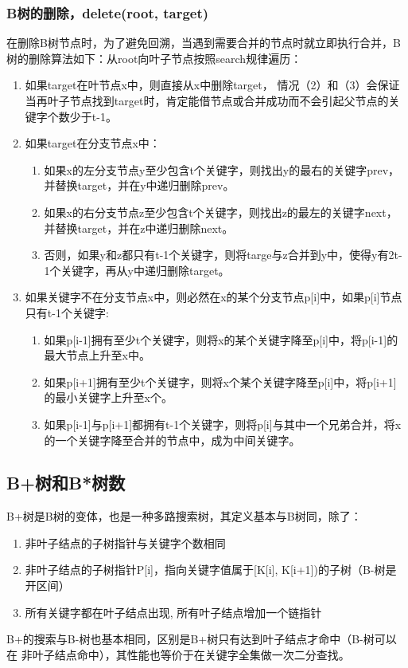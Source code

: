 \subsubsection{B树的删除，delete(root, target)}
在删除B树节点时，为了避免回溯，当遇到需要合并的节点时就立即执行合并，B树的删除算法如下：从root向叶子节点按照search规律遍历：
\begin{enumerate}
\item 如果target在叶节点x中，则直接从x中删除target，
情况（2）和（3）会保证当再叶子节点找到target时，肯定能借节点或合并成功而不会引起父节点的关键字个数少于t-1。
\item  如果target在分支节点x中：
	\begin{enumerate}
		\item 如果x的左分支节点y至少包含t个关键字，则找出y的最右的关键字prev，并替换target，并在y中递归删除prev。
		\item 如果x的右分支节点z至少包含t个关键字，则找出z的最左的关键字next，并替换target，并在z中递归删除next。
		\item 否则，如果y和z都只有t-1个关键字，则将targe与z合并到y中，使得y有2t-1个关键字，再从y中递归删除target。
	\end{enumerate}
\item 如果关键字不在分支节点x中，则必然在x的某个分支节点p[i]中，如果p[i]节点只有t-1个关键字:
	\begin{enumerate}
		\item 如果p[i-1]拥有至少t个关键字，则将x的某个关键字降至p[i]中，将p[i-1]的最大节点上升至x中。
		\item 如果p[i+1]拥有至少t个关键字，则将x个某个关键字降至p[i]中，将p[i+1]的最小关键字上升至x个。
		\item 如果p[i-1]与p[i+1]都拥有t-1个关键字，则将p[i]与其中一个兄弟合并，将x的一个关键字降至合并的节点中，成为中间关键字。
	\end{enumerate}
\end{enumerate}

\subsection{B+树和B*树数}
B+树是B树的变体，也是一种多路搜索树，其定义基本与B树同，除了：
\begin{enumerate}
  \item 非叶子结点的子树指针与关键字个数相同
  \item 非叶子结点的子树指针P[i]，指向关键字值属于[K[i], K[i+1])的子树（B-树是开区间）
  \item 所有关键字都在叶子结点出现, 所有叶子结点增加一个链指针
\end{enumerate}
 B+的搜索与B-树也基本相同，区别是B+树只有达到叶子结点才命中（B-树可以在
非叶子结点命中），其性能也等价于在关键字全集做一次二分查找。

